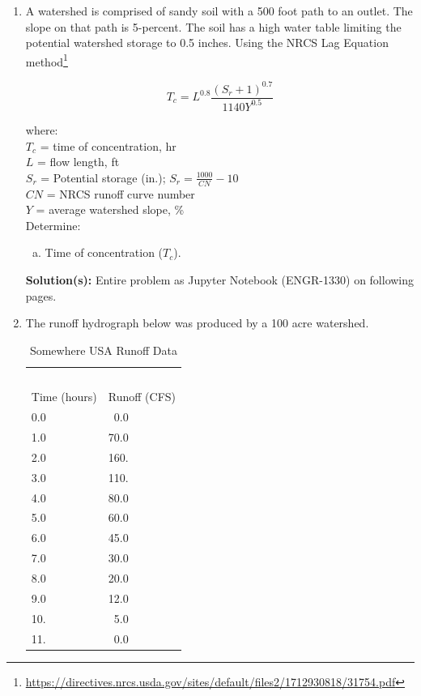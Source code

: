 \documentclass[12pt]{article}
\newcommand\mytab{\tabto{1cm}}
\begin{document}
\begin{enumerate}
\clearpage

\item A watershed is comprised of sandy soil with a 500 foot path to an outlet.  The slope on that path is 5-percent.  The soil has a high water table limiting the potential watershed storage to 0.5 inches.  Using the NRCS Lag Equation method\footnote{\url{https://directives.nrcs.usda.gov/sites/default/files2/1712930818/31754.pdf}}

\begin{equation}
T_c = L^{0.8} \frac{(S_r + 1)^{0.7}}{1140 Y^{0.5}}
\end{equation}


where: \\
\mytab $T_c$ = time of concentration, hr \\
\mytab $L$ = flow length, ft \\
\mytab $S_r$ = Potential storage (in.); $S_r = \frac{1000}{CN}-10$ \\
\mytab $CN$ = NRCS runoff curve number \\
\mytab $Y$ = average watershed slope, \% \\


Determine:
    \begin{enumerate}[a)]
        \item Time of concentration ($T_c$).
    \end{enumerate}

\textbf{Solution(s):}
Entire problem as Jupyter Notebook (ENGR-1330) on following pages.


\clearpage

\item The runoff hydrograph below was produced by a 100 acre watershed.

\begin{table}[h!]
\centering
\caption{Somewhere USA Runoff Data}
\begin{tabular}{p{2.0in}p{2.0in}} %
~&~\\
Time (hours) & Runoff (CFS) \\
\hline
\hline
0.0 & ~0.0 \\
1.0 & 70.0 \\
2.0 & 160. \\
3.0 & 110. \\
4.0 & 80.0 \\
5.0 & 60.0 \\
6.0 & 45.0 \\
7.0 & 30.0 \\
8.0 & 20.0 \\
9.0 & 12.0 \\
10. & ~5.0 \\
11. & ~0.0 \\
\hline
\end{tabular}
\label{tab:SomewhereUSARain}
\end{table}


\end{enumerate}
\end{document}
